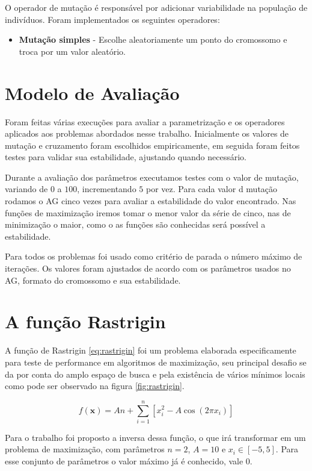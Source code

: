 \documentclass[conference]{IEEEtran}
\begin{document}
O operador de mutação é responsável por adicionar variabilidade na população de indivíduos. Foram implementados os seguintes operadores:

\begin{itemize}
  \item \textbf{Mutação simples} - Escolhe aleatoriamente um ponto do cromossomo e troca por um valor aleatório.
\end{itemize}


\section{Modelo de Avaliação}

Foram feitas várias execuções para avaliar a parametrização e os operadores aplicados aos problemas abordados nesse trabalho.  Inicialmente os valores de mutação e cruzamento foram escolhidos empiricamente, em seguida foram feitos testes para validar sua estabilidade, ajustando quando necessário.

Durante a avaliação dos parâmetros executamos testes com o valor de mutação, variando de $0$ a $100$, incrementando $5$ por vez. Para cada valor d mutação rodamos o AG cinco vezes para avaliar a estabilidade do valor encontrado. Nas funções de maximização iremos tomar o menor valor da série de cinco, nas de minimização o maior, como o as funções são conhecidas será possível a estabilidade.

Para todos os problemas foi usado como critério de parada o número máximo de iterações. Os valores foram ajustados de acordo com os parâmetros usados no AG, formato do cromossomo e sua estabilidade.

\section{A função Rastrigin}

A função de Rastrigin \ref{eq:rastrigin} foi um problema elaborada especificamente para teste de performance em algoritmos de maximização, seu principal desafio se da por conta do amplo espaço de busca e pela existência de vários mínimos locais como pode ser observado na figura \ref{fig:rastrigin}.

\begin{equation}\label{eq:rastrigin}
f(\mathbf{x}) = A n + \sum_{i=1}^n \left[x_i^2 - A\cos(2 \pi x_i)\right]
\end{equation}

Para o trabalho foi proposto a inversa dessa função, o que irá transformar em um problema de maximização, com parâmetros $n=2$, $A=10$ e $x_i\in[-5,5]$. Para esse conjunto de parâmetros o valor máximo já é conhecido, vale $0$. 
\end{document}
